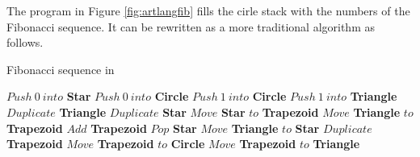 The program in Figure \ref{fig:artlangfib} fills the cirle stack with the numbers of the Fibonacci sequence.
It can be rewritten as a more traditional algorithm as follows.

\begin{algorithm}
    \caption{Fibonacci sequence in \sculpt}
    \begin{algorithmic}
    \State $Push~0~into$ \textbf{Star}
    \State $Push~0~into$ \textbf{Circle}
    \State $Push~1~into$ \textbf{Circle}
    \State $Push~1~into$ \textbf{Triangle}
        \State $Duplicate$ \textbf{Triangle}
        \State $Duplicate$ \textbf{Star}
        \State $Move$ \textbf{Star} $to$ \textbf{Trapezoid}
        \State $Move$ \textbf{Triangle} $to$ \textbf{Trapezoid}
        \State $Add$ \textbf{Trapezoid}
        \State $Pop$ \textbf{Star}
        \State $Move$ \textbf{Triangle} $to$ \textbf{Star}
        \State $Duplicate$ \textbf{Trapezoid}
        \State $Move$ \textbf{Trapezoid} $to$ \textbf{Circle}
        \State $Move$ \textbf{Trapezoid} $to$ \textbf{Triangle}
    \EndWhile
    \end{algorithmic}
    \end{algorithm}
\endinput